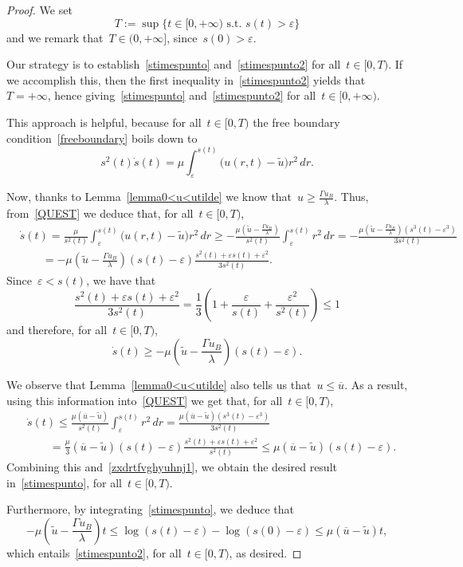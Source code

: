 \documentclass[10pt,a4paper]{amsart}
\renewcommand{\geq}{\geqslant}
\renewcommand{\ge}{\geqslant}
\renewcommand{\leq}{\leqslant}
\renewcommand{\le}{\leqslant}
\begin{document}
\begin{proof} We set $$
T:=\sup\{ t\in[0,+\infty) {\mbox{ s.t. }} s(t)>\varepsilon \}$$
and we remark that~$T\in(0,+\infty]$, since~$s(0)>\varepsilon$.

Our strategy is to establish~\eqref{stimespunto}
and~\eqref{stimespunto2} for all~$t\in[0,T)$. If we accomplish this,
then the first inequality in~\eqref{stimespunto2} yields that~$T=+\infty$,
hence giving~\eqref{stimespunto}
and~\eqref{stimespunto2} for all~$t\in[0,+\infty)$.

This approach is helpful, because for all~$t\in[0,T)$
the free boundary condition~\eqref{freeboundary} boils down to
\begin{equation}\label{QUEST}s^2(t)\dot s(t)=\mu\int_\varepsilon^{s(t)}\big(u(r,t)-\widetilde u\big)r^2\,dr.\end{equation}

Now,
thanks to Lemma~\ref{lemma0<u<utilde} we know that~$u\ge\frac{\Gamma u_B}{\lambda}$. Thus,
from~\eqref{QUEST} we deduce that, for all~$t\in[0,T)$,
\begin{equation*}\begin{split}&
\dot{s}(t)
=\frac{\mu}{s^2(t)}\int_\varepsilon^{s(t)}\big(u(r,t)-\widetilde u\big)r^2\,dr
\geq-\frac{\mu\left(\widetilde u-\frac{\Gamma u_B}{\lambda}\right)}{s^2(t)}\int_\varepsilon^{s(t)}r^2\,dr=
-\frac{\mu\left(\widetilde u-\frac{\Gamma u_B}{\lambda}\right)(s^3(t)-\varepsilon^3)}{3s^2(t)}\\&\qquad
=
-\mu\left(\widetilde u-\frac{\Gamma u_B}{\lambda}\right)(s(t)-\varepsilon)\frac{s^2(t)+\varepsilon s(t)+\varepsilon^2}{3s^2(t)}.\end{split}
\end{equation*}
Since~$\varepsilon<s(t)$, we have that
$$ \frac{s^2(t)+\varepsilon s(t)+\varepsilon^2}{3s^2(t)}=
\frac13\left(1+\frac{\varepsilon}{s(t)}+\frac{\varepsilon^2}{s^2(t)}\right)\le 1
$$ and therefore, for all~$t\in[0,T)$,
\begin{equation}\label{zxdrtfvghyuhnj1} \dot{s}(t)
\ge -\mu\left(\widetilde u-\frac{\Gamma u_B}{\lambda}\right)(s(t)-\varepsilon). \end{equation}

We observe that Lemma~\ref{lemma0<u<utilde} also tells us that~$u\le \overline{u}$. As a result,
using this information into~\eqref{QUEST} we get that, for all~$t\in[0,T)$,
\begin{equation*}
\begin{split}
&\dot{s}(t)\leq \frac{\mu(\overline{u}-\widetilde u)}{s^2(t)}\int_\varepsilon^{s(t)}r^2\,dr
=\frac{\mu(\overline{u}-\widetilde u)(s^3(t)-\varepsilon^3)}{3s^2(t)}
\\&\qquad=\frac{\mu}{3}(\overline{u}-\widetilde u)(s(t)-\varepsilon)\frac{s^2(t)+\varepsilon s(t)+\varepsilon^2}{s^2(t)}
\le \mu(\overline{u}-\widetilde u)(s(t)-\varepsilon).
\end{split}
\end{equation*}
Combining this and~\eqref{zxdrtfvghyuhnj1}, we obtain the desired result in~\eqref{stimespunto}, for all~$t\in[0,T)$.

Furthermore, by integrating~\eqref{stimespunto},  we deduce that
\[
-\mu\left(\widetilde u-\frac{\Gamma u_B}{\lambda}\right) t\leq \log(s(t)-\varepsilon)-\log(s(0)-\varepsilon)\leq \mu(\overline{u}-\widetilde u) t,
\]
which entails~\eqref{stimespunto2}, for all~$t\in[0,T)$, as desired.
\end{proof}
\end{document}
